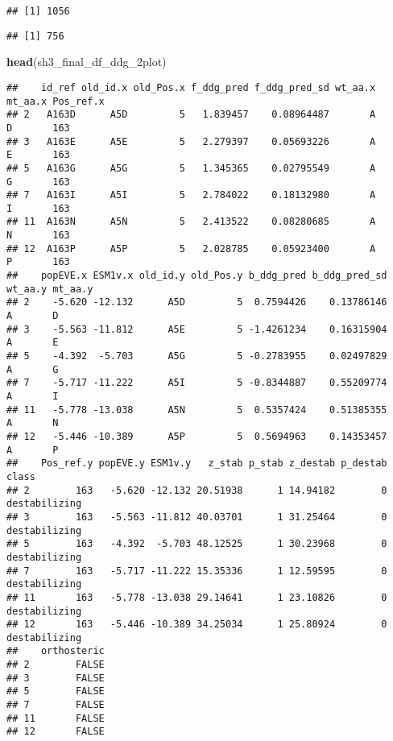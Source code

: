 \documentclass[
]{article}
\newenvironment{Shaded}{\begin{snugshade}}{\end{snugshade}}
\newcommand{\CommentTok}[1]{\textcolor[rgb]{0.56,0.35,0.01}{\textit{#1}}}
\newcommand{\FunctionTok}[1]{\textcolor[rgb]{0.13,0.29,0.53}{\textbf{#1}}}
\newcommand{\NormalTok}[1]{#1}
\newcommand{\OtherTok}[1]{\textcolor[rgb]{0.56,0.35,0.01}{#1}}
\newcommand{\SpecialCharTok}[1]{\textcolor[rgb]{0.81,0.36,0.00}{\textbf{#1}}}
\begin{document}
\begin{verbatim}
## [1] 1056
\end{verbatim}

\begin{Shaded}
\end{Shaded}

\begin{verbatim}
## [1] 756
\end{verbatim}

\begin{Shaded}
\begin{Highlighting}[]
\FunctionTok{head}\NormalTok{(sh3\_final\_df\_ddg\_2plot)}
\end{Highlighting}
\end{Shaded}

\begin{verbatim}
##    id_ref old_id.x old_Pos.x f_ddg_pred f_ddg_pred_sd wt_aa.x mt_aa.x Pos_ref.x
## 2   A163D      A5D         5   1.839457    0.08964487       A       D       163
## 3   A163E      A5E         5   2.279397    0.05693226       A       E       163
## 5   A163G      A5G         5   1.345365    0.02795549       A       G       163
## 7   A163I      A5I         5   2.784022    0.18132980       A       I       163
## 11  A163N      A5N         5   2.413522    0.08280685       A       N       163
## 12  A163P      A5P         5   2.028785    0.05923400       A       P       163
##    popEVE.x ESM1v.x old_id.y old_Pos.y b_ddg_pred b_ddg_pred_sd wt_aa.y mt_aa.y
## 2    -5.620 -12.132      A5D         5  0.7594426    0.13786146       A       D
## 3    -5.563 -11.812      A5E         5 -1.4261234    0.16315904       A       E
## 5    -4.392  -5.703      A5G         5 -0.2783955    0.02497829       A       G
## 7    -5.717 -11.222      A5I         5 -0.8344887    0.55209774       A       I
## 11   -5.778 -13.038      A5N         5  0.5357424    0.51385355       A       N
## 12   -5.446 -10.389      A5P         5  0.5694963    0.14353457       A       P
##    Pos_ref.y popEVE.y ESM1v.y   z_stab p_stab z_destab p_destab         class
## 2        163   -5.620 -12.132 20.51938      1 14.94182        0 destabilizing
## 3        163   -5.563 -11.812 40.03701      1 31.25464        0 destabilizing
## 5        163   -4.392  -5.703 48.12525      1 30.23968        0 destabilizing
## 7        163   -5.717 -11.222 15.35336      1 12.59595        0 destabilizing
## 11       163   -5.778 -13.038 29.14641      1 23.10826        0 destabilizing
## 12       163   -5.446 -10.389 34.25034      1 25.80924        0 destabilizing
##    orthosteric
## 2        FALSE
## 3        FALSE
## 5        FALSE
## 7        FALSE
## 11       FALSE
## 12       FALSE
\end{verbatim}
\end{document}
